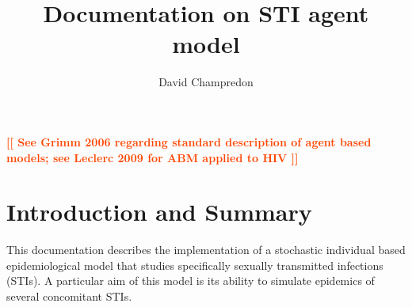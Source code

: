 \documentclass[11pt, onecolumn]{article}
\title{Documentation on STI agent model}
\author{David Champredon}
\newcommand{\warning}[1]{\textbf{\textcolor{OrangeRed}{#1}}}
\begin{document}
\maketitle

\tableofcontents


\newpage

\warning{[[ See Grimm 2006 regarding standard description of agent based models; see Leclerc 2009 \cite{Leclerc:2009ep} for ABM applied to HIV ]]}

\section{Introduction and Summary}

This documentation describes the implementation of a stochastic individual based epidemiological model that studies specifically sexually transmitted infections (STIs). A particular aim of this model is its ability to simulate epidemics of several concomitant STIs.
\end{document}

